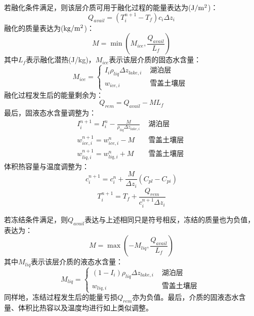 若融化条件满足，则该层介质可用于融化过程的能量表达为($\rm J/m^2$)：
\begin{equation}
Q_{avail}=\left(T_{i}^{n+1}-T_{f}\right) c_{i} \Delta z_{i}
\end{equation}
融化的质量表达为($\rm kg/m^2$)：
\begin{equation}
M=\min \left(M_{ice}, \frac{Q_{a v a i l}}{L_{f}}\right)
\end{equation}
其中$L_f$表示融化潜热(J/kg)，$M_{ice}$表示该层介质的固态水含量：
\begin{equation}
M_{ice}=\left\{\begin{array}{lr}I_{i} \rho_{liq} \Delta z_{lake, i} & 
    \text { 湖泊层 } \\ w_{ice, i} & \text { 雪盖土壤层 }\end{array}\right.
\end{equation}
融化过程发生后的能量剩余为：
\begin{equation}
Q_{rem}=Q_{avail}-M L_{f}
\end{equation}
最后，固液态水含量调整为：
\begin{equation}
\begin{array}{cc}I_{i}^{n+1}=I_{i}^{n}-\frac{M}{\rho_{liq} \Delta z_{lake, i}} & \text { 湖泊层 } \\
     w_{ice, i}^{n+1}=w_{ice, i}^{n}-M & \text { 雪盖土壤层 } \\ 
     w_{liq, i}^{n+1}=w_{liq, i}^{n}+M & \text { 雪盖土壤层 }\end{array}
\end{equation}
体积热容量与温度调整为：
\begin{equation}
c_{i}^{n+1}=c_{i}^{n}+\frac{M}{\Delta z_{i}}\left(C_{p l}-C_{p i}\right)
\end{equation}
\begin{equation}
T_{i}^{n+1}=T_{f}+\frac{Q_{rem}}{c_{i}^{n+1} \Delta z_{i}}
\end{equation}

若冻结条件满足，则$Q_{avail}$表达与上述相同只是符号相反，冻结的质量也为负值，表达为：
\begin{equation}
M=\max \left(-M_{liq}, \frac{Q_{avail}}{L_{f}}\right)
\end{equation}
其中$M_{liq}$表示该层介质的液态水含量：
\begin{equation}
M_{liq}=\left\{\begin{array}{cc}\left(1-I_{i}\right) \rho_{liq} \Delta z_{lake, i} & \text { 湖泊层 } \\
     w_{liq, i} & \text { 雪盖土壤层 }\end{array}\right.
\end{equation}
同样地，冻结过程发生后的能量亏损$Q_{rem}$亦为负值。最后，介质的固液态水含量、体积比热容以及温度均进行如上类似调整。


